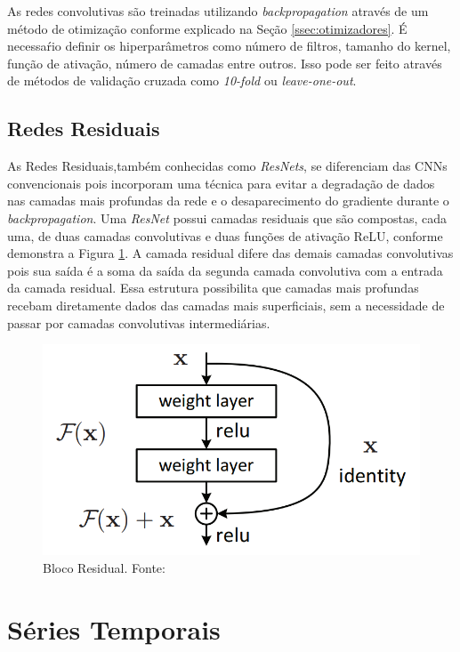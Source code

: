 As redes convolutivas são treinadas utilizando \textit{backpropagation} através de um método de otimização conforme explicado na Seção \ref{ssec:otimizadores}. É necessaŕio definir os hiperparâmetros como número de filtros, tamanho do kernel, função de ativação, número de camadas entre outros. Isso pode ser feito através de métodos de validação cruzada como \textit{10-fold} ou \textit{leave-one-out}.

\subsection{Redes Residuais}
As Redes Residuais,também conhecidas como \textit{ResNets}\cite{resnet2015}, se diferenciam das CNNs convencionais pois incorporam uma técnica para evitar a degradação de dados nas camadas mais profundas da rede e o desaparecimento do gradiente durante o \textit{backpropagation}. Uma \textit{ResNet} possui camadas residuais que são compostas, cada uma, de duas camadas convolutivas e duas funções de ativação ReLU, conforme demonstra a Figura \ref{fig-resblock}. A camada residual difere das  demais camadas convolutivas pois sua saída é a soma da saída da segunda camada convolutiva com a entrada da camada residual. Essa estrutura possibilita que camadas mais profundas recebam diretamente dados das camadas mais superficiais, sem a necessidade de passar por camadas convolutivas intermediárias.

\begin{figure}[H]
	\centering
	\includegraphics[scale=0.3]{pasta1_figuras/resblock.png}
	\caption {Bloco Residual. Fonte: \cite{resnet2015}}
	\label{fig-resblock}
\end{figure}

\section{Séries Temporais}

